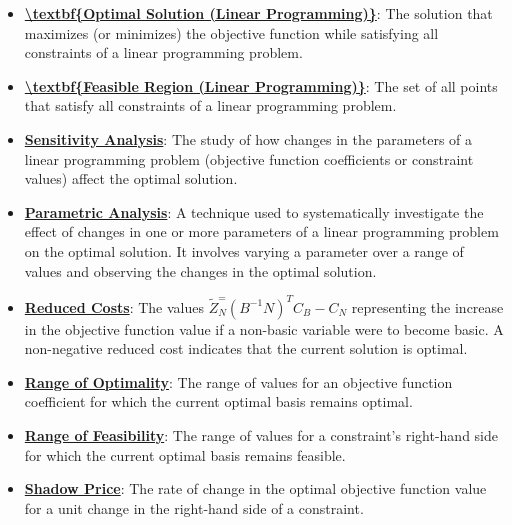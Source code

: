 \documentclass{article}%
\begin{document}
\begin{itemize}[leftmargin=*]
\item \href{https://www.math.purdue.edu/~yipn/421//2024-09-24-SimplexMatrix.pdf#page=16}{\textbf{\textbackslash{}textbf\{Optimal Solution (Linear Programming)\}}}: The solution that maximizes (or minimizes) the objective function while satisfying all constraints of a linear programming problem.%
\item \href{https://www.math.purdue.edu/~yipn/421//2024-09-24-SimplexMatrix.pdf#page=16}{\textbf{\textbackslash{}textbf\{Feasible Region (Linear Programming)\}}}: The set of all points that satisfy all constraints of a linear programming problem.%
\end{itemize}%
\begin{itemize}[leftmargin=*]%
\item \href{https://www.math.purdue.edu/~yipn/421//2024-09-26-Sensitivity.pdf#page=7}{\textbf{Sensitivity Analysis}}: The study of how changes in the parameters of a linear programming problem (objective function coefficients or constraint values) affect the optimal solution.%
\item \href{https://www.math.purdue.edu/~yipn/421//2024-09-26-Sensitivity.pdf#page=4}{\textbf{Parametric Analysis}}: A technique used to systematically investigate the effect of changes in one or more parameters of a linear programming problem on the optimal solution.  It involves varying a parameter over a range of values and observing the changes in the optimal solution.%
\item \href{https://www.math.purdue.edu/~yipn/421//2024-09-26-Sensitivity.pdf#page=7}{\textbf{Reduced Costs}}: The values $\tilde{Z}_N^ = (B^{-1} N)^T C_B - C_N$ representing the increase in the objective function value if a non-basic variable were to become basic.  A non-negative reduced cost indicates that the current solution is optimal.%
\item \href{https://www.math.purdue.edu/~yipn/421//2024-09-26-Sensitivity.pdf#page=4}{\textbf{Range of Optimality}}: The range of values for an objective function coefficient for which the current optimal basis remains optimal.%
\item \href{https://www.math.purdue.edu/~yipn/421//2024-09-26-Sensitivity.pdf#page=8}{\textbf{Range of Feasibility}}: The range of values for a constraint's right-hand side for which the current optimal basis remains feasible.%
\end{itemize}%
\begin{itemize}[leftmargin=*]%
\item \href{https://www.math.purdue.edu/~yipn/421//2024-10-01-SensitivityDuality.pdf#page=10}{\textbf{Shadow Price}}: The rate of change in the optimal objective function value for a unit change in the right-hand side of a constraint.%
\end{itemize}%
\end{document}
